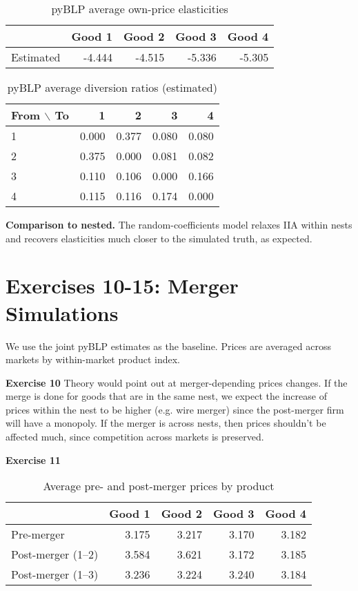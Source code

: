 \documentclass[11pt]{article}
\begin{document}
	\begin{table}[h!]
		\centering
		\caption{pyBLP average own-price elasticities}
		\label{tab:blpown}
		\begin{tabular}{lrrrr}
			\toprule
			& Good 1 & Good 2 & Good 3 & Good 4 \\
			\midrule
			Estimated & -4.444 & -4.515 & -5.336 & -5.305 \\
			\bottomrule
		\end{tabular}
	\end{table}
	
	\begin{table}[h!]
		\centering
		\caption{pyBLP average diversion ratios (estimated)}
		\label{tab:blpdiv}
		\begin{tabular}{lrrrr}
			\toprule
			From $\backslash$ To & 1 & 2 & 3 & 4 \\
			\midrule
			1 & 0.000 & 0.377 & 0.080 & 0.080 \\
			2 & 0.375 & 0.000 & 0.081 & 0.082 \\
			3 & 0.110 & 0.106 & 0.000 & 0.166 \\
			4 & 0.115 & 0.116 & 0.174 & 0.000 \\
			\bottomrule
		\end{tabular}
	\end{table}
	
	\noindent
	\textbf{Comparison to nested.} The random-coefficients model relaxes IIA within nests and
	recovers elasticities much closer to the simulated truth, as expected.
	
	\newpage
	\section*{Exercises 10-15: Merger Simulations}
	We use the joint pyBLP estimates as the baseline. Prices are averaged across markets by within-market
	product index.
	
	\textbf{Exercise 10} Theory would point out at merger-depending prices changes. If the merge is done for goods that are in the same nest, we expect the increase of prices within the nest to be higher (e.g. wire merger) since the post-merger firm will have a monopoly. If the merger is across nests, then prices shouldn't be affected much, since competition across markets is preserved.
	
	\textbf{Exercise 11}
	\begin{table}[h!]
		\centering
		\caption{Average pre- and post-merger prices by product}
		\label{tab:mergerlevels}
		\begin{tabular}{lrrrr}
			\toprule
			& Good 1 & Good 2 & Good 3 & Good 4 \\
			\midrule
			Pre-merger           & 3.175 & 3.217 & 3.170 & 3.182 \\
			Post-merger (1--2)   & 3.584 & 3.621 & 3.172 & 3.185 \\
			Post-merger (1--3)   & 3.236 & 3.224 & 3.240 & 3.184 \\
			\bottomrule
		\end{tabular}
	\end{table}
	
\end{document}
